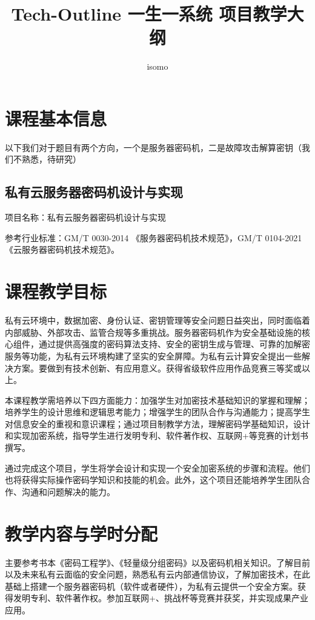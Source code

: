 \documentclass{article}
\title{Tech-Outline 一生一系统 项目教学大纲}
\author{isomo}
\begin{document}
\maketitle

\section{课程基本信息}

以下我们对于题目有两个方向，一个是服务器密码机，二是故障攻击解算密钥（我们不熟悉，待研究）

\subsection{私有云服务器密码机设计与实现}

项目名称：私有云服务器密码机设计与实现

参考行业标准：GM/T 0030-2014 《服务器密码机技术规范》，GM/T 0104-2021《云服务器密码机技术规范》。

\section{课程教学目标}

私有云环境中，数据加密、身份认证、密钥管理等安全问题日益突出，同时面临着内部威胁、外部攻击、监管合规等多重挑战。服务器密码机作为安全基础设施的核心组件，通过提供高强度的密码算法支持、安全的密钥生成与管理、可靠的加解密服务等功能，为私有云环境构建了坚实的安全屏障。为私有云计算安全提出一些解决方案。要做到有技术创新、有应用意义。获得省级软件应用作品竞赛三等奖或以上。

本课程教学需培养以下四方面能力：加强学生对加密技术基础知识的掌握和理解；培养学生的设计思维和逻辑思考能力；增强学生的团队合作与沟通能力；提高学生对信息安全的重视和意识课程；通过项目制教学方法，理解密码学基础知识，设计和实现加密系统，指导学生进行发明专利、软件著作权、互联网+等竞赛的计划书撰写。

通过完成这个项目，学生将学会设计和实现一个安全加密系统的步骤和流程。他们也将获得实际操作密码学知识和技能的机会。此外，这个项目还能培养学生团队合作、沟通和问题解决的能力。 

\section{教学内容与学时分配}

主要参考书本《密码工程学》、《轻量级分组密码》以及密码机相关知识。了解目前以及未来私有云面临的安全问题，熟悉私有云内部通信协议，了解加密技术，在此基础上搭建一个服务器密码机（软件或者硬件），为私有云提供一个安全方案。获得发明专利、软件著作权。参加互联网+、挑战杯等竞赛并获奖，并实现成果产业应用。
\end{document}
